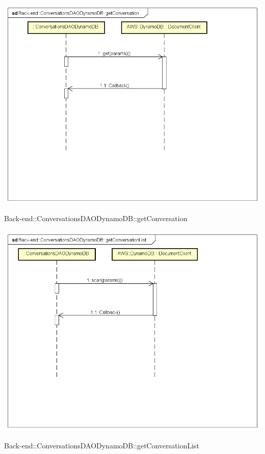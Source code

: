 \includegraphics[width=\textwidth,height=\textheight,keepaspectratio]{images/diagrams/back-end/Ufficial_Backend/Back-end__ConversationsDAODynamoDB__getConversation.png} 	\caption{Back-end::ConversationsDAODynamoDB::getConversation}
\includegraphics[width=\textwidth,height=\textheight,keepaspectratio]{images/diagrams/back-end/Ufficial_Backend/Back-end__ConversationsDAODynamoDB__getConversationList.png} 	\caption{Back-end::ConversationsDAODynamoDB::getConversationList}
